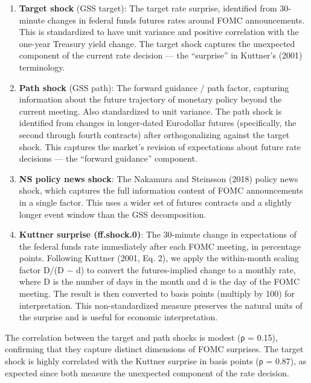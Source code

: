 \documentclass[
]{article}
\begin{document}
\begin{enumerate}
\def\labelenumi{\arabic{enumi}.}
\item
  \textbf{Target shock} (GSS target): The target rate surprise,
  identified from 30-minute changes in federal funds futures rates
  around FOMC announcements. This is standardized to have unit variance
  and positive correlation with the one-year Treasury yield change. The
  target shock captures the unexpected component of the current rate
  decision --- the ``surprise'' in Kuttner's (2001) terminology.
\item
  \textbf{Path shock} (GSS path): The forward guidance / path factor,
  capturing information about the future trajectory of monetary policy
  beyond the current meeting. Also standardized to unit variance. The
  path shock is identified from changes in longer-dated Eurodollar
  futures (specifically, the second through fourth contracts) after
  orthogonalizing against the target shock. This captures the market's
  revision of expectations about future rate decisions --- the ``forward
  guidance'' component.
\item
  \textbf{NS policy news shock}: The Nakamura and Steinsson (2018)
  policy news shock, which captures the full information content of FOMC
  announcements in a single factor. This uses a wider set of futures
  contracts and a slightly longer event window than the GSS
  decomposition.
\item
  \textbf{Kuttner surprise (ff.shock.0)}: The 30-minute change in
  expectations of the federal funds rate immediately after each FOMC
  meeting, in percentage points. Following Kuttner (2001, Eq. 2), we
  apply the within-month scaling factor D/(D − d) to convert the
  futures-implied change to a monthly rate, where D is the number of
  days in the month and d is the day of the FOMC meeting. The result is
  then converted to basis points (multiply by 100) for interpretation.
  This non-standardized measure preserves the natural units of the
  surprise and is useful for economic interpretation.
\end{enumerate}

The correlation between the target and path shocks is modest (ρ = 0.15),
confirming that they capture distinct dimensions of FOMC surprises. The
target shock is highly correlated with the Kuttner surprise in basis
points (ρ = 0.87), as expected since both measure the unexpected
component of the rate decision.
\end{document}
